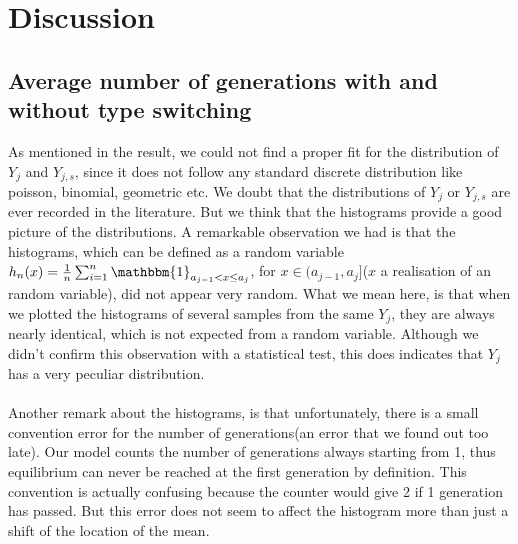 \section{Discussion}
\subsection{Average number of generations with and without type switching}
As mentioned in the result, we could not find a proper fit for the distribution of $Y_{j}$ and $Y_{j,s}$, since it does not follow any standard discrete distribution like poisson, binomial, geometric etc. We doubt that the distributions of $Y_j$ or $Y_{j,s}$ are ever recorded in the literature. But we think that the histograms provide a good picture of the distributions. A remarkable observation we had is that the histograms, which can be defined as a random variable $h_n(x)=\frac{1}{n}\sum^n_{i=1}\mathbbm{1}_{a_{j-1}<x\leq a_j}$, for $x\in (a_{j-1},a_j]$($x$ a realisation of an random variable),  did not appear very random. What we mean here, is that when we plotted the histograms of several samples from the same $Y_j$, they are always nearly identical, which is not expected from a random variable. Although we didn't confirm this observation with a statistical test, this does indicates that $Y_j$ has a very peculiar distribution.\\
\\
Another remark about the histograms, is that unfortunately, there is a small convention error for the number of generations(an error that we found out too late). Our model counts the number of generations always starting from 1, thus equilibrium can never be reached at the first generation by definition. This convention is actually confusing because the counter would give 2 if 1 generation has passed. But this error does not seem to affect the histogram more than just a shift of the location of the mean.\\
\\


  